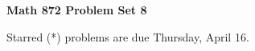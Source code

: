 \documentclass[12pt]{article}
\begin{document}
\def\ctln{\centerline}
\def\msk{\medskip}
\def\bsk{\bigskip}
\def\ssk{\smallskip}
\def\hsk{\hskip.3in}
\def\ra{\rightarrow}
\def\ubr{\underbar}

\def\mt{{\mathcal T}}
\def\mb{{\mathcal B}}
\def\ms{{\mathcal S}}
\def\mu{{\mathcal U}}
\def\mv{{\mathcal V}}

\def\bbr{{\mathbb R}}
\def\bbz{{\mathbb Z}}
\def\bbq{{\mathbb Q}}
\def\spc{$~$\hskip.15in$~$}

\def\sset{\subseteq}
\def\del{\partial}
\def\lra{$\Leftrightarrow$}
\def\bra{$\Rightarrow$}
\def\wtl{\widetilde}



\ctln{\bf Math 872 Problem Set 8}

\msk

Starred (*) problems are due Thursday, April 16.
\end{document}
